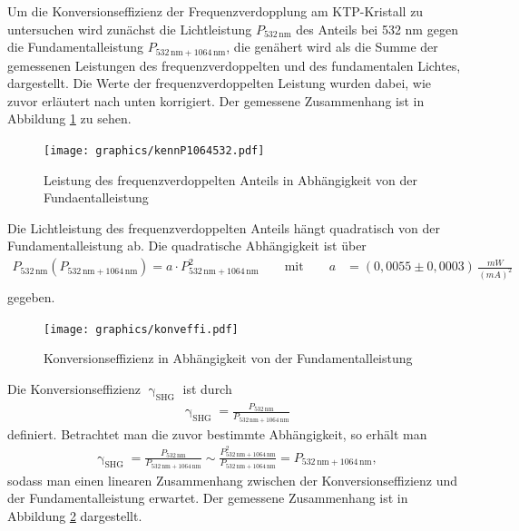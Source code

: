 \documentclass[twoside,colorback,accentcolor=tud4c,11pt]{tudreport}
\begin{document}
Um die Konversionseffizienz der Frequenzverdopplung am KTP-Kristall zu untersuchen wird zunächst die Lichtleistung $P_{532\,\text{nm}}$ des Anteils bei 532 nm gegen die Fundamentalleistung $P_{532\,\text{nm}+1064\,\text{nm}}$, die genähert wird als die Summe der gemessenen Leistungen des frequenzverdoppelten und des fundamentalen Lichtes, dargestellt. Die Werte der frequenzverdoppelten Leistung wurden dabei, wie zuvor erläutert nach unten korrigiert. Der gemessene Zusammenhang ist in Abbildung \ref{a_4.4_3} zu sehen.
\begin{figure}[H]
\centering
   	\begin{minipage}[b]{0.85\textwidth}
   	\texttt{[image: graphics/kennP1064532.pdf]}
  	\label{a_4.4_3}
   	\end{minipage}
\caption{Leistung des frequenzverdoppelten Anteils in Abhängigkeit von der Fundaentalleistung}	
\end{figure}
Die Lichtleistung des frequenzverdoppelten Anteils hängt quadratisch von der Fundamentalleistung ab. Die quadratische Abhängigkeit ist über  
\begin{align*}
P_{532\,\text{nm}}(P_{532\,\text{nm}+1064\,\text{nm}})=a\cdot P^2_{532\,\text{nm}+1064\,\text{nm}} \qquad \text{mit} \qquad
a&=(0,0055\pm0,0003)\,\frac{\si{mW}}{(\si{mA})^2}\\
\end{align*}
gegeben.
\begin{figure}[H]
\centering
   	\begin{minipage}[b]{0.85\textwidth}
   	\texttt{[image: graphics/konveffi.pdf]}
  	\label{a_4.4_4}
   	\end{minipage}
\caption{Konversionseffizienz in Abhängigkeit von der Fundamentalleistung}	
\end{figure}
\pagebreak
Die Konversionseffizienz $\upgamma_{\text{SHG}}$ ist durch
\begin{align*}
\upgamma_{\text{SHG}}=\frac{P_{532\,\text{nm}}}{P_{532\,\text{nm}+1064\,\text{nm}}}
\end{align*}
definiert.
Betrachtet man die zuvor bestimmte Abhängigkeit, so erhält man
\begin{align*}
\upgamma_{\text{SHG}}=\frac{P_{532\,\text{nm}}}{P_{532\,\text{nm}+1064\,\text{nm}}}\sim\frac{P^2_{532\,\text{nm}+1064\,\text{nm}}}{P_{532\,\text{nm}+1064\,\text{nm}}}=P_{532\,\text{nm}+1064\,\text{nm}},
\end{align*}
sodass man einen linearen Zusammenhang zwischen der Konversionseffizienz und der Fundamentalleistung erwartet. Der gemessene Zusammenhang ist in Abbildung \ref{a_4.4_4} dargestellt. 
\end{document}
